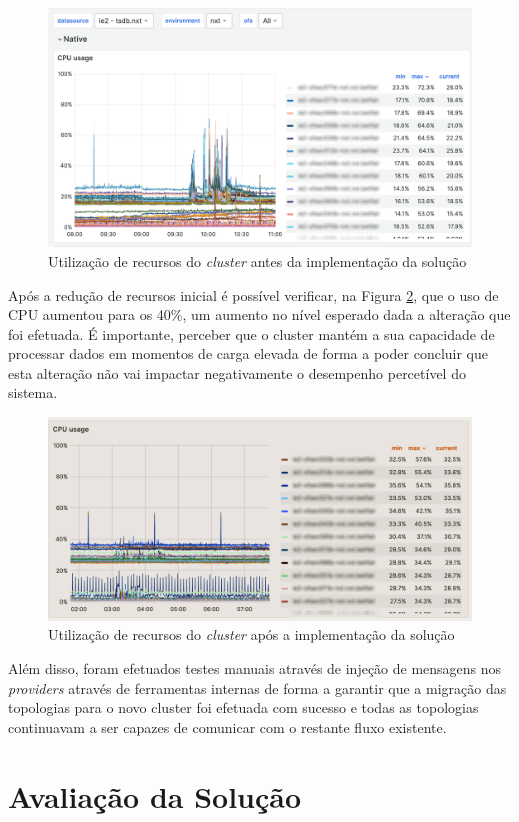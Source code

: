 \begin{figure}[H]
  \centerline{\includegraphics[scale=0.25]{media/content/impl/grafana-before-1.png}}
  \caption{Utilização de recursos do \textit{cluster} antes da implementação da solução}
  \label{usage-before}
\end{figure}

Após a redução de recursos inicial é possível verificar, na Figura \ref{usage-after}, que o uso 
de CPU aumentou para os 40\%, um aumento no nível esperado dada a alteração que foi efetuada. É 
importante, perceber que o \gls{cluster} mantém a sua capacidade de processar dados em momentos de 
carga elevada de forma a poder concluir que esta alteração não vai impactar negativamente o 
desempenho percetível do sistema. 

\begin{figure}[H]
  \centerline{\includegraphics[scale=0.5]{media/content/impl/grafana-after.png}}
  \caption{Utilização de recursos do \textit{cluster} após a implementação da solução}
  \label{usage-after}
\end{figure}

Além disso, foram efetuados testes manuais através de injeção de mensagens nos \textit{providers}
através de ferramentas internas de forma a garantir que a migração das topologias para o novo
\gls{cluster} foi efetuada com sucesso e todas as topologias continuavam a ser capazes de comunicar
com o restante fluxo existente.

\section{Avaliação da Solução}


